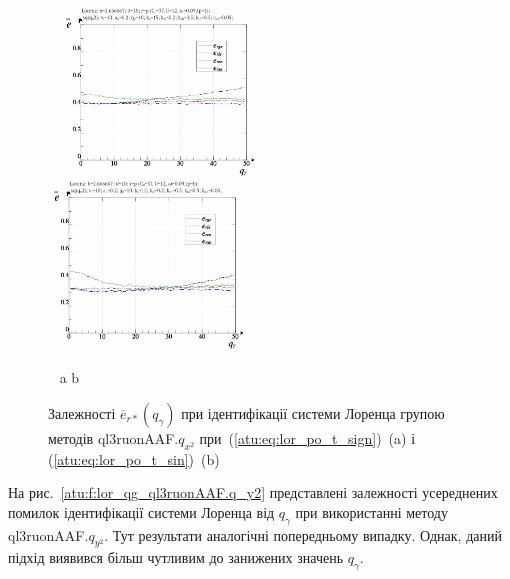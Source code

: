 \begin{figure}[ht!]
  \begin{center}
    ~ \hfill
    \includegraphics[width=0.49\textwidth]{p/cha/lor/ql3ruonAAF/lor_ql3ruonAAF_qx2-p_qgamma_e_sign.png}
    \hfill
    \includegraphics[width=0.49\textwidth]{p/cha/lor/ql3ruonAAF/lor_ql3ruonAAF_qx2-p_qgamma_e_sin.png}
    \hfill ~
  \end{center}
  \vspace{-1.0ex}
  \begin{center}
    ~ \hfill a \hfill\hfill b \hfill ~
  \end{center}
  \vspace{-1.5ex}
  \caption{Залежності $\overline{e}_{r *} (q_\gamma) $ при ідентифікації системи Лоренца групою методів ql3ruonAAF.$q_{x^2} $ при~(\ref{atu:eq:lor_po_t_sign})~(a) і (\ref{atu:eq:lor_po_t_sin})~(b)}
\label{atu:f:lor_qg_ql3ruonAAF.q_x2}
\end{figure}



На рис.~\ref{atu:f:lor_qg_ql3ruonAAF.q_y2} представлені залежності усереднених
помилок ідентифікації системи Лоренца від
$ q_\gamma $ при використанні методу
ql3ruonAAF.$q_{y^2}$.
Тут результати аналогічні попередньому випадку. Однак, даний
підхід виявився більш чутливим до занижених значень $ q_\gamma $.

